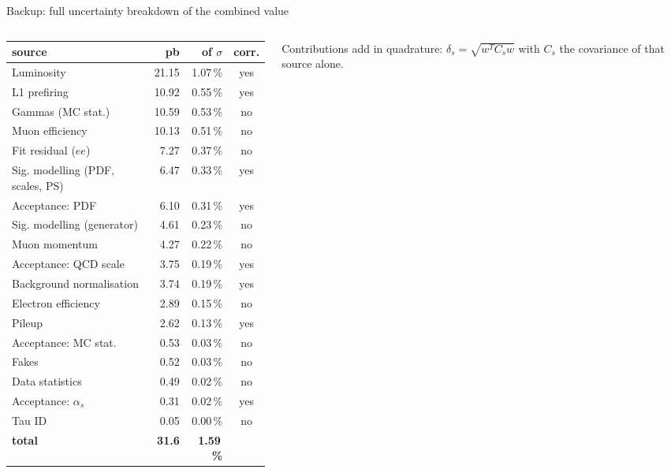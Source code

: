 \documentclass[aspectratio=169,9pt,t]{beamer}
\begin{document}
\begin{frame}[noframenumbering]{Backup: full uncertainty breakdown of the combined value}
\begin{columns}[T]
\begin{column}{0.46\textwidth}
\centering\scriptsize
\begin{tabular}{@{}lrrc@{}}
\toprule
source & pb & of $\sigma$ & corr. \\ \midrule
Luminosity & 21.15 & 1.07\,\% & yes \\
L1 prefiring & 10.92 & 0.55\,\% & yes \\
Gammas (MC stat.) & 10.59 & 0.53\,\% & no \\
Muon efficiency & 10.13 & 0.51\,\% & no \\
\alert{Fit residual ($ee$)} & \alert{\phantom{0}7.27} & \alert{0.37\,\%} & no \\
Sig. modelling (PDF, scales, PS) & \phantom{0}6.47 & 0.33\,\% & yes \\
Acceptance: PDF & \phantom{0}6.10 & 0.31\,\% & yes \\
Sig. modelling (generator) & \phantom{0}4.61 & 0.23\,\% & no \\
Muon momentum & \phantom{0}4.27 & 0.22\,\% & no \\
Acceptance: QCD scale & \phantom{0}3.75 & 0.19\,\% & yes \\
Background normalisation & \phantom{0}3.74 & 0.19\,\% & yes \\
Electron efficiency & \phantom{0}2.89 & 0.15\,\% & no \\
Pileup & \phantom{0}2.62 & 0.13\,\% & yes \\
Acceptance: MC stat. & \phantom{0}0.53 & 0.03\,\% & no \\
Fakes & \phantom{0}0.52 & 0.03\,\% & no \\
\alert{Data statistics} & \alert{\phantom{0}0.49} & \alert{0.02\,\%} & no \\
Acceptance: $\alpha_{s}$ & \phantom{0}0.31 & 0.02\,\% & yes \\
Tau ID & \phantom{0}0.05 & 0.00\,\% & no \\ \midrule
\textbf{total} & \textbf{31.6} & \textbf{1.59\,\%} & \\
\bottomrule
\end{tabular}
\end{column}
\begin{column}{0.5\textwidth}\footnotesize
\vspace{4mm}
Contributions add in quadrature: $\delta_{s} = \sqrt{w^{T}C_{s}w}$ with $C_{s}$ the covariance of
that source alone.


\end{column}
\end{columns}
\end{frame}
\end{document}
